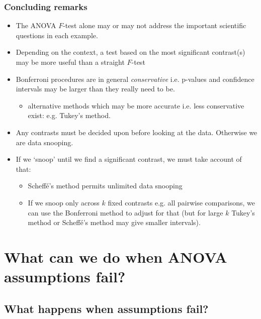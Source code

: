 \documentclass[a4paper]{article}
\begin{document}
\subsubsection{Concluding remarks}
\begin{itemize}
	\item The ANOVA \( F \)-test alone may or may not address the important scientific questions in each example.
	\item Depending on the context, a test based on the most significant contrast(s) may be more useful than a straight \( F \)-test
	\item Bonferroni procedures are in general \textit{conservative} i.e. p-values and confidence intervals may be larger than they really need to be.
	\begin{itemize}
		\item alternative methods which may be more accurate i.e. less conservative exist: e.g. Tukey's method.
	\end{itemize}
	\item Any contrasts must be decided upon before looking at the data. Otherwise we are data snooping.
	\item If we `snoop' until we find a significant contrast, we must take account of that:
	\begin{itemize}
		\item Scheffé's method permits unlimited data snooping
		\item If we snoop only across \( k \) fixed contrasts e.g. all pairwise comparisons, we can use the Bonferroni method to adjust for that (but for large \( k \) Tukey's method or Scheffé's method may give smaller intervals).
	\end{itemize}
\end{itemize}

\section{What can we do when ANOVA assumptions fail?}\label{sec:23}
\subsection{What happens when assumptions fail?}
\end{document}
